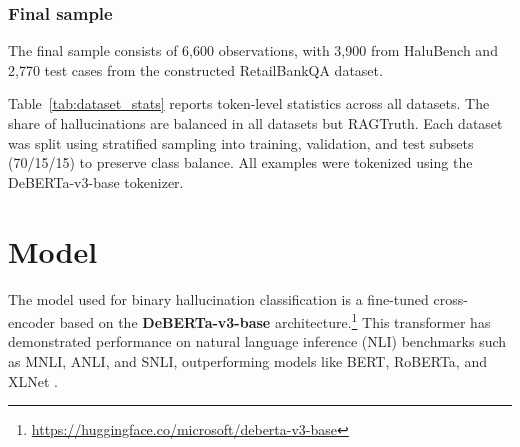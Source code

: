 \documentclass[11pt]{article}
\begin{document}
\subsubsection*{Final sample}
The final sample consists of 6,600 observations, with 3,900 from HaluBench and 2,770 test cases from the constructed RetailBankQA dataset.

\begin{table}[H]
\centering
\small
{}
\caption{Summary statistics of full training and evaluation dataset, where \textbf{\%H} denotes share of hallucinated responses and \textbf{CT} indicates context token length.}
\label{tab:dataset_stats}
\end{table}

Table~\ref{tab:dataset_stats} reports token-level statistics across all datasets. The share of hallucinations are balanced in all datasets but RAGTruth.
Each dataset was split using stratified sampling into training, validation, and test subsets (70/15/15) to preserve class balance. All examples were tokenized using the DeBERTa-v3-base tokenizer.

\section{Model}

The model used for binary hallucination classification is a fine-tuned cross-encoder based on the \textbf{DeBERTa-v3-base} architecture.\footnote{\href{https://huggingface.co/microsoft/deberta-v3-base}{https://huggingface.co/microsoft/deberta-v3-base}} This transformer has demonstrated performance on natural language inference (NLI) benchmarks such as MNLI, ANLI, and SNLI, outperforming models like BERT, RoBERTa, and XLNet \citep{he2021deberta, liu2019roberta, yang2019xlnet}.
\end{document}
